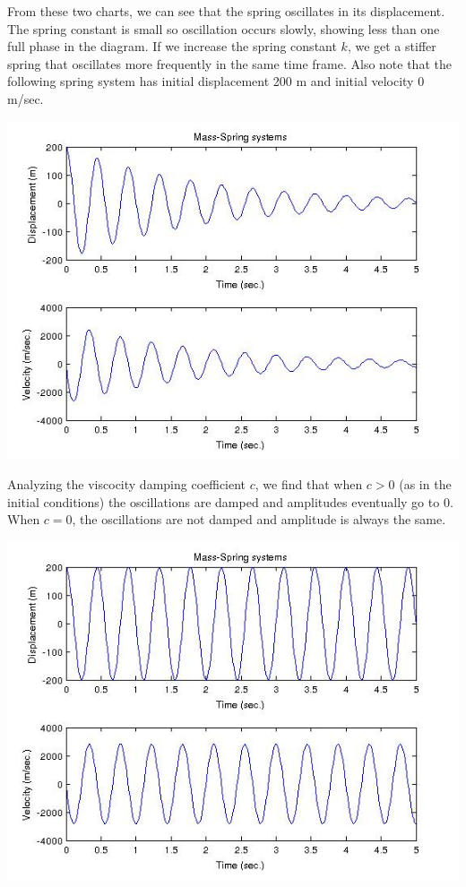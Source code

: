 \documentclass[titlepage]{article}
\begin{document}
\noindent From these two charts, we can see that the spring oscillates in its displacement. The spring constant is small so oscillation occurs slowly, showing less than one full phase in the diagram. If we increase the spring constant $k$, we get a stiffer spring that oscillates more frequently in the same time frame. Also note that the following spring system has initial displacement 200 m and initial velocity 0 m/sec.

\begin{center}
        \includegraphics[scale=0.6]{matlab/k200.jpg}
\end{center}

\noindent Analyzing the viscocity damping coefficient $c$, we find that when $c > 0$ (as in the initial conditions) the oscillations are damped and amplitudes eventually go to 0. When $c = 0$, the oscillations are not damped and amplitude is always the same.

\begin{center}
        \includegraphics[scale=0.6]{matlab/d200k200c0.jpg}
\end{center}
\end{document}
